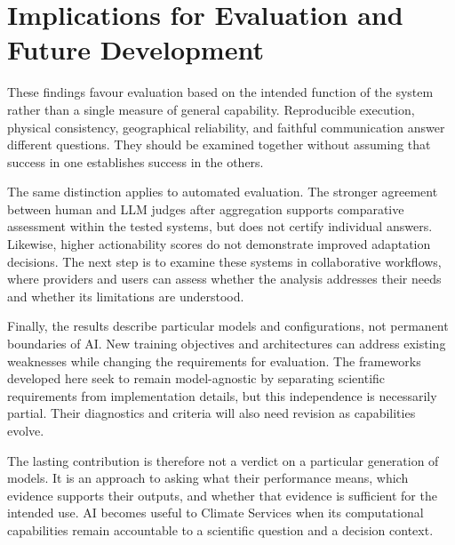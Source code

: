 \section{Implications for Evaluation and Future Development}

These findings favour evaluation based on the intended function of the system rather than a single measure of general capability. Reproducible execution, physical consistency, geographical reliability, and faithful communication answer different questions. They should be examined together without assuming that success in one establishes success in the others.

The same distinction applies to automated evaluation. The stronger agreement between human and LLM judges after aggregation supports comparative assessment within the tested systems, but does not certify individual answers. Likewise, higher actionability scores do not demonstrate improved adaptation decisions. The next step is to examine these systems in collaborative workflows, where providers and users can assess whether the analysis addresses their needs and whether its limitations are understood.

Finally, the results describe particular models and configurations, not permanent boundaries of AI. New training objectives and architectures can address existing weaknesses while changing the requirements for evaluation. The frameworks developed here seek to remain model-agnostic by separating scientific requirements from implementation details, but this independence is necessarily partial. Their diagnostics and criteria will also need revision as capabilities evolve.

The lasting contribution is therefore not a verdict on a particular generation of models. It is an approach to asking what their performance means, which evidence supports their outputs, and whether that evidence is sufficient for the intended use. AI becomes useful to Climate Services when its computational capabilities remain accountable to a scientific question and a decision context.